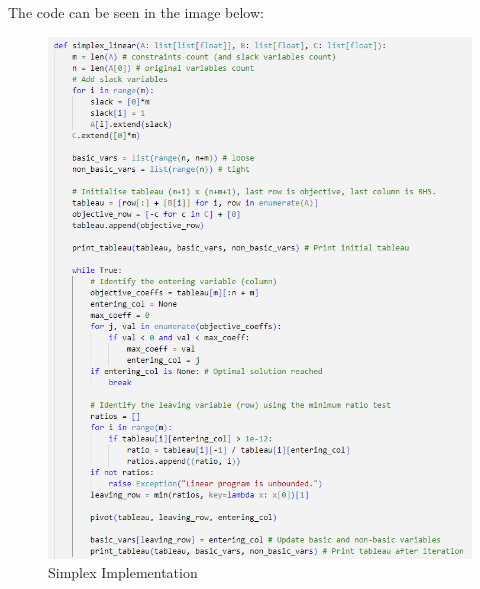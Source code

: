 \documentclass{article}
\begin{document}
The code can be seen in the image below:
\begin{figure}[H]
    \centering
    \includegraphics[width=1\textwidth]{simplex-linear.png}
    \caption{Simplex Implementation}
    \label{fig:simplex-implementation}
\end{figure}
\end{document}
